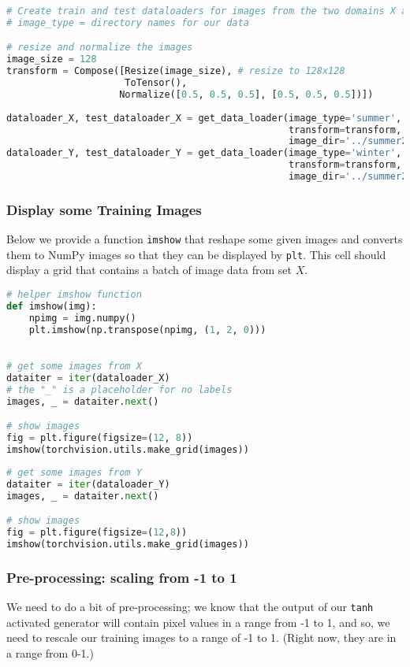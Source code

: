 \begin{lstlisting}[language=Python]
# Create train and test dataloaders for images from the two domains X and Y
# image_type = directory names for our data

# resize and normalize the images
image_size = 128
transform = Compose([Resize(image_size), # resize to 128x128
                     ToTensor(),
                    Normalize([0.5, 0.5, 0.5], [0.5, 0.5, 0.5])])
    
dataloader_X, test_dataloader_X = get_data_loader(image_type='summer', 
                                                  transform=transform,
                                                  image_dir='../summer2winter_yosemite/',)
dataloader_Y, test_dataloader_Y = get_data_loader(image_type='winter', 
                                                  transform=transform,
                                                  image_dir='../summer2winter_yosemite/',)
\end{lstlisting}
\subsubsection{Display some Training Images}
Below we provide a function \lstinline{imshow} that
reshape some given images and converts them to NumPy images so that they
can be displayed by \lstinline{plt}. This cell should
display a grid that contains a batch of image data from set \(X\).

\begin{lstlisting}[language=Python]
# helper imshow function
def imshow(img):
    npimg = img.numpy()
    plt.imshow(np.transpose(npimg, (1, 2, 0)))
    

# get some images from X
dataiter = iter(dataloader_X)
# the "_" is a placeholder for no labels
images, _ = dataiter.next()

# show images
fig = plt.figure(figsize=(12, 8))
imshow(torchvision.utils.make_grid(images))
\end{lstlisting}

\begin{lstlisting}[language=Python]
# get some images from Y
dataiter = iter(dataloader_Y)
images, _ = dataiter.next()

# show images
fig = plt.figure(figsize=(12,8))
imshow(torchvision.utils.make_grid(images))
\end{lstlisting}

\subsubsection{Pre-processing: scaling from -1 to 1}
We need to do a bit of pre-processing; we know that the output of our
\lstinline{tanh} activated generator will contain pixel
values in a range from -1 to 1, and so, we need to rescale our training
images to a range of -1 to 1. (Right now, they are in a range from 0-1.) \newline

